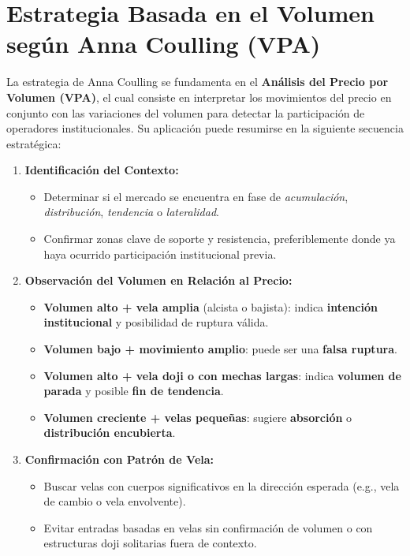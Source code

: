 \section*{Estrategia Basada en el Volumen según Anna Coulling (VPA)}

La estrategia de Anna Coulling se fundamenta en el \textbf{Análisis del Precio por Volumen (VPA)}, el cual consiste en interpretar los movimientos del precio en conjunto con las variaciones del volumen para detectar la participación de operadores institucionales. Su aplicación puede resumirse en la siguiente secuencia estratégica:

\begin{enumerate}
    \item \textbf{Identificación del Contexto:}
    \begin{itemize}
        \item Determinar si el mercado se encuentra en fase de \textit{acumulación}, \textit{distribución}, \textit{tendencia} o \textit{lateralidad}.
        \item Confirmar zonas clave de soporte y resistencia, preferiblemente donde ya haya ocurrido participación institucional previa.
    \end{itemize}

    \item \textbf{Observación del Volumen en Relación al Precio:}
    \begin{itemize}
        \item \textbf{Volumen alto + vela amplia} (alcista o bajista): indica \textbf{intención institucional} y posibilidad de ruptura válida.
        \item \textbf{Volumen bajo + movimiento amplio}: puede ser una \textbf{falsa ruptura}.
        \item \textbf{Volumen alto + vela doji o con mechas largas}: indica \textbf{volumen de parada} y posible \textbf{fin de tendencia}.
        \item \textbf{Volumen creciente + velas pequeñas}: sugiere \textbf{absorción} o \textbf{distribución encubierta}.
    \end{itemize}

    \item \textbf{Confirmación con Patrón de Vela:}
    \begin{itemize}
        \item Buscar velas con cuerpos significativos en la dirección esperada (e.g., vela de cambio o vela envolvente).
        \item Evitar entradas basadas en velas sin confirmación de volumen o con estructuras doji solitarias fuera de contexto.
    \end{itemize}


\end{enumerate}
